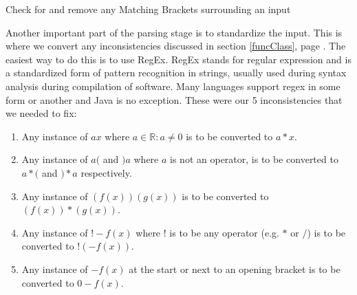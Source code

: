 \documentclass{report}
\begin{document}
\begin{algorithm}[H]
\DontPrintSemicolon
\caption{Check for and remove any Matching Brackets surrounding an input}
\end{algorithm}
\newpage
Another important part of the parsing stage is to standardize the input. This is where we convert any inconsistencies discussed in section \ref{funcClass}, page \pageref{funcClass}. The easiest way to do this is to use RegEx. RegEx stands for regular expression and is a standardized form of pattern recognition in strings, usually used during syntax analysis during compilation of software. Many languages support regex in some form or another and Java is no exception. These were our 5 inconsistencies that we needed to fix:
\begin{enumerate}
	\item Any instance of $ax$ where $a \in  \mathbb{R} : a \neq 0$ is to be converted to $a*x$.
	\item Any instance of $a($ and $)a$ where $a$ is not an operator, is to be converted to $a*($ and $)*a$ respectively.
	\item Any instance of $(f(x))(g(x))$ is to be converted to $(f(x))*(g(x))$.
	\item Any instance of $!-f(x)$ where $!$ is to be any operator (e.g. $*$ or $/$) is to be converted to $! (-f(x))$.
	\item Any instance of $-f(x)$ at the start or next to an opening bracket is to be converted to $0 - f(x)$.
\end{enumerate}
\end{document}
